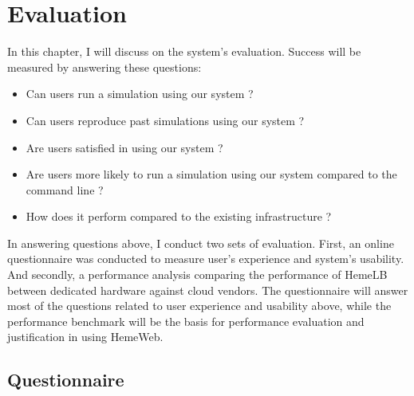  

\chapter[Evaluation]{Evaluation}
In this chapter, I will discuss on the system's evaluation. Success will be measured by answering these questions:

\begin{itemize}
    \item Can users run a simulation using our system ?
    \item Can users reproduce past simulations using our system ?
    \item Are users satisfied in using our system ?
    \item Are users more likely to run a simulation using our system compared to the command line ?
    \item How does it perform compared to the existing infrastructure ?
\end{itemize}


In answering questions above, I conduct two sets of evaluation. First, an online questionnaire was conducted to measure user's experience and system's usability. And secondly, a performance analysis comparing the performance of HemeLB between dedicated hardware against cloud vendors. The questionnaire will answer most of the questions related to user experience and usability above, while the performance benchmark will be the basis for performance evaluation and justification in using HemeWeb.


\section{Questionnaire}

